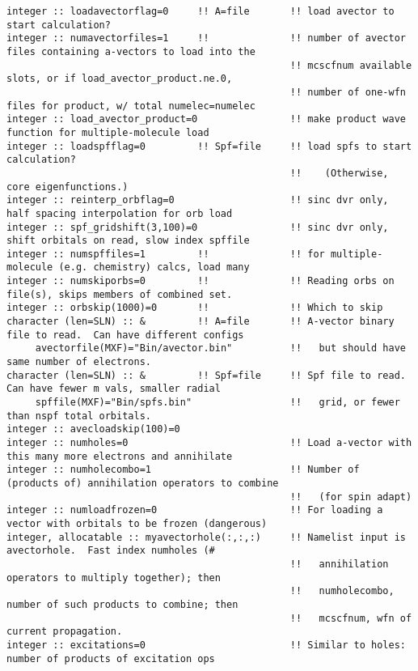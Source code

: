 \begin{verbatim}
integer :: loadavectorflag=0     !! A=file       !! load avector to start calculation?
integer :: numavectorfiles=1     !!              !! number of avector files containing a-vectors to load into the
                                                 !! mcscfnum available slots, or if load_avector_product.ne.0,
                                                 !! number of one-wfn files for product, w/ total numelec=numelec
integer :: load_avector_product=0                !! make product wave function for multiple-molecule load
integer :: loadspfflag=0         !! Spf=file     !! load spfs to start calculation?  
                                                 !!    (Otherwise, core eigenfunctions.)
integer :: reinterp_orbflag=0                    !! sinc dvr only, half spacing interpolation for orb load
integer :: spf_gridshift(3,100)=0                !! sinc dvr only, shift orbitals on read, slow index spffile
integer :: numspffiles=1         !!              !! for multiple-molecule (e.g. chemistry) calcs, load many
integer :: numskiporbs=0         !!              !! Reading orbs on file(s), skips members of combined set.
integer :: orbskip(1000)=0       !!              !! Which to skip
character (len=SLN) :: &         !! A=file       !! A-vector binary file to read.  Can have different configs
     avectorfile(MXF)="Bin/avector.bin"          !!   but should have same number of electrons.   
character (len=SLN) :: &         !! Spf=file     !! Spf file to read.  Can have fewer m vals, smaller radial 
     spffile(MXF)="Bin/spfs.bin"                 !!   grid, or fewer than nspf total orbitals. 
integer :: avecloadskip(100)=0
integer :: numholes=0                            !! Load a-vector with this many more electrons and annihilate
integer :: numholecombo=1                        !! Number of (products of) annihilation operators to combine 
                                                 !!   (for spin adapt)
integer :: numloadfrozen=0                       !! For loading a vector with orbitals to be frozen (dangerous)
integer, allocatable :: myavectorhole(:,:,:)     !! Namelist input is avectorhole.  Fast index numholes (#
                                                 !!   annihilation operators to multiply together); then    
                                                 !!   numholecombo, number of such products to combine; then
                                                 !!   mcscfnum, wfn of current propagation.
integer :: excitations=0                         !! Similar to holes: number of products of excitation ops

\end{verbatim}
